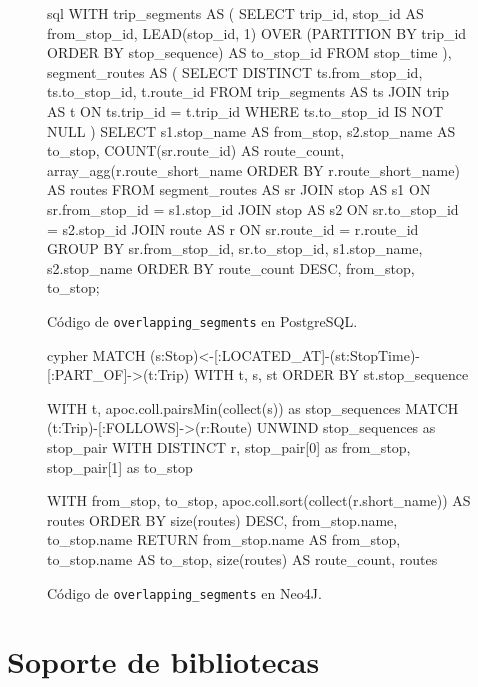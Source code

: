 \begin{figure}[p]
    \centering
    \begin{huggedminted}{sql}
WITH trip_segments AS (
    SELECT
        trip_id,
        stop_id AS from_stop_id,
        LEAD(stop_id, 1) OVER
            (PARTITION BY trip_id ORDER BY stop_sequence) AS to_stop_id
    FROM stop_time
),
segment_routes AS (
    SELECT DISTINCT
        ts.from_stop_id,
        ts.to_stop_id,
        t.route_id
    FROM trip_segments AS ts
        JOIN trip AS t ON ts.trip_id = t.trip_id
    WHERE ts.to_stop_id IS NOT NULL
)
SELECT
    s1.stop_name AS from_stop,
    s2.stop_name AS to_stop,
    COUNT(sr.route_id) AS route_count,
    array_agg(r.route_short_name ORDER BY r.route_short_name) AS routes
FROM segment_routes AS sr
    JOIN stop AS s1 ON sr.from_stop_id = s1.stop_id
    JOIN stop AS s2 ON sr.to_stop_id = s2.stop_id
    JOIN route AS r ON sr.route_id = r.route_id
GROUP BY sr.from_stop_id, sr.to_stop_id, s1.stop_name, s2.stop_name
ORDER BY route_count DESC, from_stop, to_stop;
    \end{huggedminted}
    \caption{Código de \texttt{overlapping\_segments} en PostgreSQL.}
    \label{comparison:querying_postgres}
\end{figure}

\begin{figure}[p]
    \centering
    \begin{huggedminted}{cypher}
MATCH (s:Stop)<-[:LOCATED_AT]-(st:StopTime)-[:PART_OF]->(t:Trip)
WITH t, s, st
ORDER BY st.stop_sequence

WITH t, apoc.coll.pairsMin(collect(s)) as stop_sequences
MATCH (t:Trip)-[:FOLLOWS]->(r:Route)
UNWIND stop_sequences as stop_pair
WITH DISTINCT r, stop_pair[0] as from_stop, stop_pair[1] as to_stop

WITH from_stop, to_stop, apoc.coll.sort(collect(r.short_name)) AS routes
ORDER BY size(routes) DESC, from_stop.name, to_stop.name
RETURN from_stop.name AS from_stop,
       to_stop.name AS to_stop,
       size(routes) AS route_count,
       routes
    \end{huggedminted}
    \caption{Código de \texttt{overlapping\_segments} en Neo4J.}
    \label{comparison:querying_neo4j}
\end{figure}

\clearpage %



\section{Soporte de bibliotecas}

